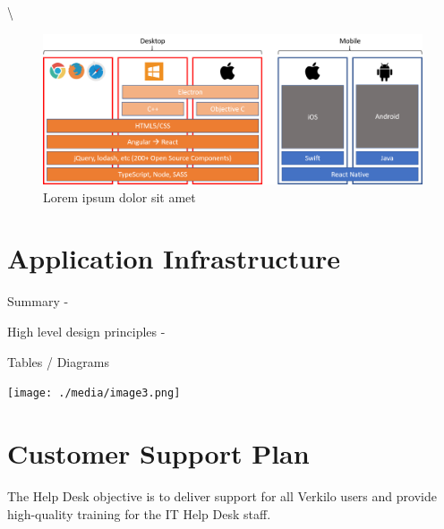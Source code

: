 \documentclass[11pt,openany]{book}
\begin{document}
\textbackslash{}

\begin{figure}
\centering
\includegraphics{./media/react-crossplatform.png}
\caption{Lorem ipsum dolor sit amet}
\end{figure}

\hypertarget{application-infrastructure}{%
\section{Application Infrastructure}\label{application-infrastructure}}

Summary -

High level design principles -

Tables / Diagrams

\texttt{[image: ./media/image3.png]}

\hypertarget{customer-support-plan}{%
\section{Customer Support Plan}\label{customer-support-plan}}

The Help Desk objective is to deliver support for all Verkilo users and
provide high-quality training for the IT Help Desk staff.
\end{document}
